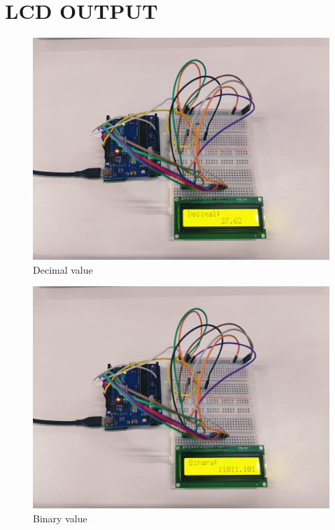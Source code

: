 \documentclass[journal,12pt,twocolumn]{IEEEtran}
\begin{document}
    \section{\textbf{LCD OUTPUT}}
 \begin{figure}[H]
\centering
\includegraphics[width=\columnwidth]{figs/decimal_out.jpg}
\caption{Decimal value}
\label{fig:lcd}
\end{figure}

\begin{figure}[H]
\centering
\includegraphics[width=\columnwidth]{figs/binary_out.jpg}
\caption{Binary value}
\label{fig:lcd}
\end{figure}
 
\end{document}
